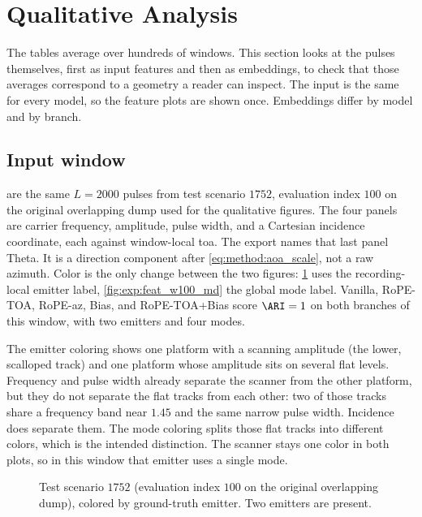 \section{Qualitative Analysis}\label{sec:exp:qualitative}

The tables average over hundreds of windows.
This section looks at the pulses themselves, first as input features and then as embeddings, to check that those averages correspond to a geometry a reader can inspect.
The input is the same for every model, so the feature plots are shown once.
Embeddings differ by model and by branch.

\subsection*{Input window}\label{sec:exp:qualitative:features}

 are the same $L=2000$ pulses from test scenario $1752$, evaluation index $100$ on the original overlapping dump used for the qualitative figures.
The four panels are carrier frequency, amplitude, pulse width, and a Cartesian incidence coordinate, each against window-local \gls{toa}.
The export names that last panel Theta. It is a direction component after \cref{eq:method:aoa_scale}, not a raw azimuth.
Color is the only change between the two figures: \cref{fig:exp:feat_w100_em} uses the recording-local emitter label, \cref{fig:exp:feat_w100_md} the global mode label.
Vanilla, RoPE-TOA, RoPE-az, Bias, and RoPE-TOA+Bias score $\ARI=1$ on both branches of this window, with two emitters and four modes.

The emitter coloring shows one platform with a scanning amplitude (the lower, scalloped track) and one platform whose amplitude sits on several flat levels.
Frequency and pulse width already separate the scanner from the other platform, but they do not separate the flat tracks from each other: two of those tracks share a frequency band near $1.45$ and the same narrow pulse width.
Incidence does separate them.
The mode coloring splits those flat tracks into different colors, which is the intended distinction.
The scanner stays one color in both plots, so in this window that emitter uses a single mode.

\begin{figure}[tbp]
  \centering
  \caption{Test scenario $1752$ (evaluation index $100$ on the original overlapping dump), colored by ground-truth emitter. Two emitters are present.}
  \label{fig:exp:feat_w100_em}
\end{figure}

